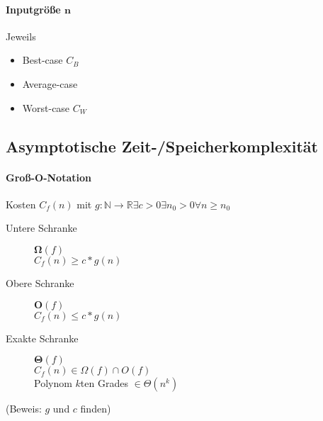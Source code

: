 \paragraph{Inputgrö\ss e $\mathbf{n}$} Jeweils

\begin{itemize}
  \item Best-case $C_B$

  \item Average-case

  \item Worst-case $C_W$
\end{itemize}

\subsection{Asymptotische Zeit-/Speicherkomplexität}

\begin{mzImportant}
  \paragraph{Gro\ss-O-Notation}
  Kosten $C_f(n)$ mit $g: \mathbb{N} \rightarrow \mathbb{R} \exists c > 0 \exists n_0 > 0 \forall n \geq n_0$

  \begin{description}
    \item [Untere Schranke] $\boldsymbol{\Omega} (f)$ \\
          $C_f(n) \boldsymbol{\geq} c * g(n)$

    \item [Obere Schranke] $\boldsymbol{O}(f)$ \\
          $C_f(n) \boldsymbol{\leq} c * g(n)$

    \item [Exakte Schranke] $\boldsymbol{\Theta} (f)$ \\
          $C_f(n) \in \Omega (f) \cap O(f)$ \\
          Polynom $k$ten Grades $\in \Theta (n^k)$
  \end{description}

  (Beweis: $g$ und $c$ finden)
\end{mzImportant}

